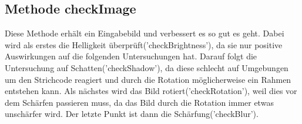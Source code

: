 \subsection*{Methode checkImage}
Diese Methode erhält ein Eingabebild und verbessert es so gut es geht.
Dabei wird als erstes die Helligkeit überprüft('checkBrightness'), da sie nur positive Auswirkungen auf die folgenden Untersuchungen hat.
Darauf folgt die Untersuchung auf Schatten('checkShadow'), da diese schlecht auf Umgebungen um den Strichcode reagiert und durch die Rotation möglicherweise ein Rahmen entstehen kann.
Als nächstes wird das Bild rotiert('checkRotation'), weil dies vor dem Schärfen passieren muss, da das Bild durch die Rotation immer etwas unschärfer wird.
Der letzte Punkt ist dann die Schärfung('checkBlur').